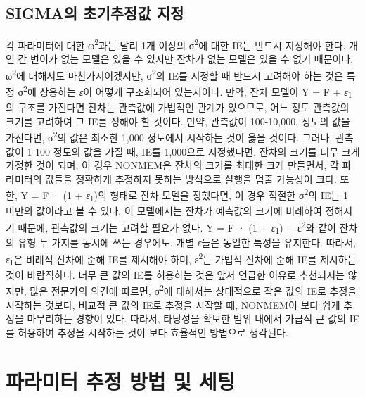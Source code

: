 \documentclass[
  11pt,
  krantz2,
  a4paper]{krantz}
\theoremstyle{definition}
\theoremstyle{definition}
\theoremstyle{definition}
\theoremstyle{remark}
\begin{document}
\hypertarget{sigmauxc758-uxcd08uxae30uxcd94uxc815uxac12-uxc9c0uxc815}{%
\section{SIGMA의 초기추정값 지정}\label{sigmauxc758-uxcd08uxae30uxcd94uxc815uxac12-uxc9c0uxc815}}

각 파라미터에 대한 ω\textsuperscript{2}과는 달리 1개 이상의 σ\textsuperscript{2}에 대한 IE는 반드시 지정해야 한다. 개인 간 변이가 없는 모델은 있을 수 있지만 잔차가 없는 모델은 있을 수 없기 때문이다. ω\textsuperscript{2}에 대해서도 마찬가지이겠지만, σ\textsuperscript{2}의 IE를 지정할 때 반드시 고려해야 하는 것은 특정 σ\textsuperscript{2}에 상응하는 \emph{ε}이 어떻게 구조화되어 있는지이다. 만약, 잔차 모델이 Y = F + \emph{ε}\textsubscript{1}의 구조를 가진다면 잔차는 관측값에 가법적인 관계가 있으므로, 어느 정도 관측값의 크기를 고려하여 그 IE를 정해야 할 것이다. 만약, 관측값이 100-10,000, 정도의 값을 가진다면, σ\textsuperscript{2}의 값은 최소한 1,000 정도에서 시작하는 것이 옳을 것이다. 그러나, 관측값이 1-100 정도의 값을 가질 때, IE를 1,000으로 지정했다면, 잔차의 크기를 너무 크게 가정한 것이 되며, 이 경우 NONMEM은 잔차의 크기를 최대한 크게 만들면서, 각 파라미터의 값들을 정확하게 추정하지 못하는 방식으로 실행을 멈출 가능성이 크다. 또한, Y = F · (1 + \emph{ε}\textsubscript{1})의 형태로 잔차 모델을 정했다면, 이 경우 적절한 σ\textsuperscript{2}의 IE는 1 미만의 값이라고 볼 수 있다. 이 모델에서는 잔차가 예측값의 크기에 비례하여 정해지기 때문에, 관측값의 크기는 고려할 필요가 없다. Y = F · (1 + \emph{ε}\textsubscript{1}) + ε\textsuperscript{2}와 같이 잔차의 유형 두 가지를 동시에 쓰는 경우에도, 개별 \emph{ε}들은 동일한 특성을 유지한다. 따라서, \emph{ε}\textsubscript{1}은 비례적 잔차에 준해 IE를 제시해야 하며, ε\textsuperscript{2}는 가법적 잔차에 준해 IE를 제시하는 것이 바람직하다. 너무 큰 값의 IE를 허용하는 것은 앞서 언급한 이유로 추천되지는 않지만, 많은 전문가의 의견에 따르면, σ\textsuperscript{2}에 대해서는 상대적으로 작은 값의 IE로 추정을 시작하는 것보다, 비교적 큰 값의 IE로 추정을 시작할 때, NONMEM이 보다 쉽게 추정을 마무리하는 경향이 있다. 따라서, 타당성을 확보한 범위 내에서 가급적 큰 값의 IE를 허용하여 추정을 시작하는 것이 보다 효율적인 방법으로 생각된다.

\hypertarget{estimation-methods}{%
\chapter{파라미터 추정 방법 및 세팅}\label{estimation-methods}}
\end{document}
